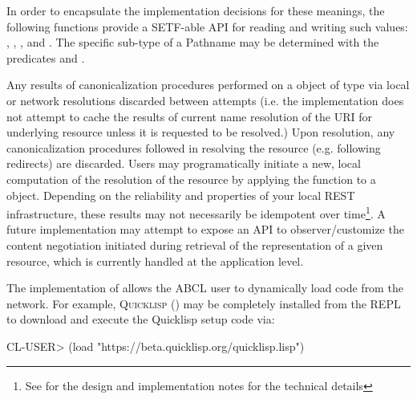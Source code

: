 \documentclass[10pt]{book}
\begin{document}
In order to encapsulate the implementation decisions for these
meanings, the following functions provide a SETF-able API for
reading and writing such values: ,
, , and
.  The specific sub-type of a Pathname may
be determined with the predicates  and
.

\label{EXTENSIONS:URL-PATHNAME-SCHEME}

\label{EXTENSIONS:URL-PATHNAME-FRAGMENT}

\label{EXTENSIONS:URL-PATHNAME-AUTHORITY}

\label{EXTENSIONS:PATHNAME-URL-P}

\label{EXTENSIONS:URL-PATHNAME-QUERY}

Any results of canonicalization procedures performed on a object of
type  via local or network resolutions
discarded between attempts (i.e. the implementation does not attempt
to cache the results of current name resolution of the URI for
underlying resource unless it is requested to be resolved.)  Upon
resolution, any canonicalization procedures followed in resolving the
resource (e.g. following redirects) are discarded.  Users may
programatically initiate a new, local computation of the resolution of
the resource by applying the  function to a
 object.  Depending on the reliability and
properties of your local \textsc{REST} infrastructure, these results
may not necessarily be idempotent over time\footnote {See
\cite{uri-pathname} for the design and implementation notes for the
technical details}.  A future implementation may attempt to expose an
API to observer/customize the content negotiation initiated during
retrieval of the representation of a given resource, which is
currently handled at the application level.

The implementation of  allows the \textsc{ABCL}
user to dynamically load code from the network.  For example,
\textsc{Quicklisp} (\cite{quicklisp}) may be completely installed from
the \textsc{REPL} to download and execute the Quicklisp setup code via:

\begin{listing-lisp}
  CL-USER> (load "https://beta.quicklisp.org/quicklisp.lisp")
\end{listing-lisp}
\end{document}
